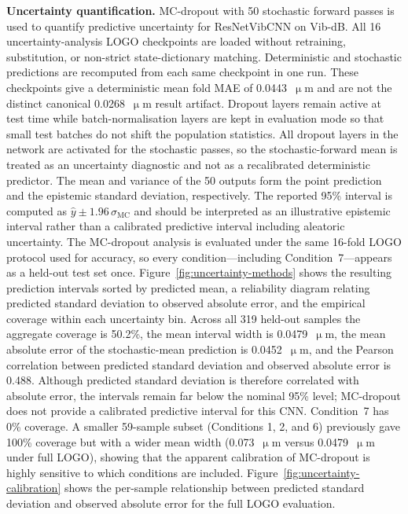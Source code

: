 \textbf{Uncertainty quantification.}
MC-dropout with 50 stochastic forward passes is used to quantify
predictive uncertainty for ResNetVibCNN on Vib-dB. All 16
uncertainty-analysis LOGO checkpoints are loaded without retraining,
substitution, or non-strict state-dictionary matching. Deterministic and
stochastic predictions are recomputed from each same checkpoint in one run.
These checkpoints give a deterministic mean fold MAE of 0.0443~\(\upmu\)m
and are not the distinct canonical 0.0268~\(\upmu\)m result artifact.
Dropout layers remain active at test time while
batch-normalisation layers are kept in evaluation mode so that small test
batches do not shift the population statistics. All dropout layers in the
network are activated for the stochastic passes, so the stochastic-forward
mean is treated as an uncertainty diagnostic and not as a recalibrated
deterministic predictor. The mean and variance of the 50 outputs form the
point prediction and the epistemic standard deviation, respectively. The
reported 95\% interval is computed as
\(\hat y \pm 1.96\,\sigma_{\text{MC}}\) and should be interpreted as an
illustrative epistemic interval rather than a calibrated predictive
interval including aleatoric uncertainty. The MC-dropout analysis is
evaluated under the same 16-fold LOGO protocol used for accuracy, so
every condition---including Condition~7---appears as a held-out test set
once. Figure~\ref{fig:uncertainty-methods} shows the resulting prediction
intervals sorted by predicted mean, a reliability diagram relating
predicted standard deviation to observed absolute error, and the
empirical coverage within each uncertainty bin. Across all 319 held-out
samples the aggregate coverage is 50.2\%, the mean interval width is
0.0479~\(\upmu\)m, the mean absolute error of the stochastic-mean prediction
is 0.0452~\(\upmu\)m, and the Pearson correlation between predicted standard
deviation and observed absolute error is 0.488. Although predicted
standard deviation is therefore correlated with absolute error, the
intervals remain far below the nominal 95\% level; MC-dropout does not
provide a calibrated predictive interval for this CNN. Condition~7 has
0\% coverage. A smaller 59-sample subset (Conditions 1, 2, and 6)
previously gave 100\% coverage but with a wider mean width
(0.073~\(\upmu\)m versus 0.0479~\(\upmu\)m under full LOGO), showing that the
apparent calibration of MC-dropout is highly sensitive to which conditions
are included.
Figure~\ref{fig:uncertainty-calibration} shows the per-sample
relationship between predicted standard deviation and observed absolute
error for the full LOGO evaluation.

